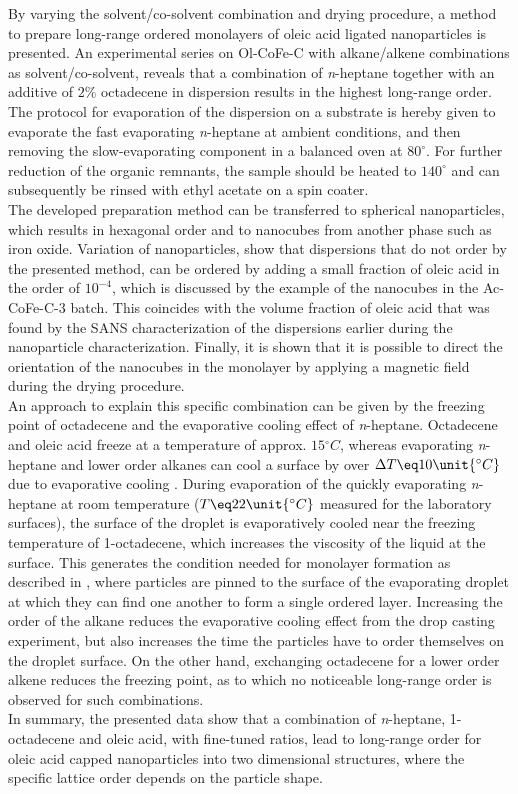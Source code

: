 \documentclass[\main/dresen_thesis.tex]{subfiles}
\begin{document}
  By varying the solvent/co-solvent combination and drying procedure, a method to prepare long-range ordered monolayers of oleic acid ligated nanoparticles is presented.
  An experimental series on Ol-CoFe-C with alkane/alkene combinations as solvent/co-solvent, reveals that a combination of \textit{n}-heptane together with an additive of $2 \%$ octadecene in dispersion results in the highest long-range order.
  The protocol for evaporation of the dispersion on a substrate is hereby given to evaporate the fast evaporating \textit{n}-heptane at ambient conditions, and then removing the slow-evaporating component in a balanced oven at $80 ^\circ$.
  For further reduction of the organic remnants, the sample should be heated to $140 ^\circ$ and can subsequently be rinsed with ethyl acetate on a spin coater.
  \\

  The developed preparation method can be transferred to spherical nanoparticles, which results in hexagonal order and to nanocubes from another phase such as iron oxide.
  Variation of nanoparticles, show that dispersions that do not order by the presented method, can be ordered by adding a small fraction of oleic acid in the order of $10^{-4}$, which is discussed by the example of the nanocubes in the Ac-CoFe-C-3 batch.
  This coincides with the volume fraction of oleic acid that was found by the SANS characterization of the dispersions earlier during the nanoparticle characterization.
  Finally, it is shown that it is possible to direct the orientation of the nanocubes in the monolayer by applying a magnetic field during the drying procedure.
  \\

  An approach to explain this specific combination can be given by the freezing point of octadecene and the evaporative cooling effect of \textit{n}-heptane.
  Octadecene and oleic acid freeze at a temperature of approx. $15 \unit{^\circ C}$, whereas evaporating \textit{n}-heptane and lower order alkanes can cool a surface by over $\Delta T \eq 10 \unit{^\circ C}$ due to evaporative cooling \cite{Tuckermann_2002_Evapo}.
  During evaporation of the quickly evaporating \textit{n}-heptane at room temperature ($T \eq 22 \unit{^\circ C}$ measured for the laboratory surfaces), the surface of the droplet is evaporatively cooled near the freezing temperature of 1-octadecene, which increases the viscosity of the liquid at the surface.
  This generates the condition needed for monolayer formation as described in \cite{Bigioni_2006_Kinet}, where particles are pinned to the surface of the evaporating droplet at which they can find one another to form a single ordered layer.
  Increasing the order of the alkane reduces the evaporative cooling effect from the drop casting experiment, but also increases the time the particles have to order themselves on the droplet surface.
  On the other hand, exchanging octadecene for a lower order alkene reduces the freezing point, as to which no noticeable long-range order is observed for such combinations.
  \\

  In summary, the presented data show that a combination of \textit{n}-heptane, 1-octadecene and oleic acid, with fine-tuned ratios, lead to long-range order for oleic acid capped nanoparticles into two dimensional structures, where the specific lattice order depends on the particle shape.
\end{document}
